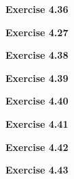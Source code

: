 \documentclass{article}
\begin{document}
\bigskip

\begin{framed}
    \noindent \textbf{Exercise 4.36}
    
    \medskip
    
    
\end{framed}


\bigskip

\begin{framed}
    \noindent \textbf{Exercise 4.27}
    
    \medskip
    
    
\end{framed}


\bigskip

\begin{framed}
    \noindent \textbf{Exercise 4.38}
    
    \medskip
    
    
\end{framed}


\bigskip

\begin{framed}
    \noindent \textbf{Exercise 4.39}
    
    \medskip
    
    
\end{framed}


\bigskip

\begin{framed}
    \noindent \textbf{Exercise 4.40}
    
    \medskip
    
    
\end{framed}


\bigskip

\begin{framed}
    \noindent \textbf{Exercise 4.41}
    
    \medskip
    
    
\end{framed}


\bigskip

\begin{framed}
    \noindent \textbf{Exercise 4.42}
    
    \medskip
    
    
\end{framed}


\bigskip

\begin{framed}
    \noindent \textbf{Exercise 4.43}
    
    \medskip
    
    
\end{framed}
\end{document}
